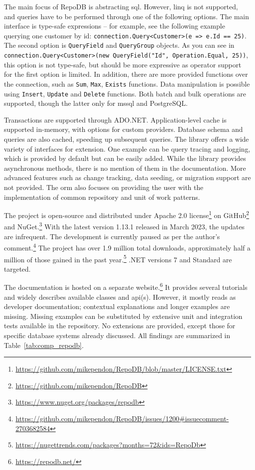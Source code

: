 The main focus of RepoDB is abstracting \acrshort{sql}. However, \acrshort{linq} is not supported, and queries have to be performed through one of the following options. The main interface is type-safe expressions -- for example, see the following example querying one customer by id: \lstinline{connection.Query<Customer>(e => e.Id == 25)}. The second option is \texttt{QueryField} and \texttt{QueryGroup} objects. As you can see in \lstinline{connection.Query<Customer>(new QueryField("Id", Operation.Equal, 25))}, this option is not type-safe, but should be more expressive as operator support for the first option is limited. In addition, there are more provided functions over the connection, such as \texttt{Sum}, \texttt{Max}, \texttt{Exists} functions. Data manipulation is possible using \texttt{Insert}, \texttt{Update} and \texttt{Delete} functions. Both batch and bulk operations are supported, though the latter only for \acrshort{mssql} and PostgreSQL.

Transactions are supported through ADO.NET. Application-level cache is supported in-memory, with options for custom providers. Database schema and queries are also cached, speeding up subsequent queries. The library offers a wide variety of interfaces for extension. One example can be query tracing and logging, which is provided by default but can be easily added. While the library provides asynchronous methods, there is no mention of them in the documentation. More advanced features such as change tracking, data seeding, or migration support are not provided. The \acrshort{orm} also focuses on providing the user with the implementation of common repository and unit of work patterns.

The project is open-source and distributed under Apache 2.0 license\footnote{\url{https://github.com/mikependon/RepoDB/blob/master/LICENSE.txt}} on GitHub\footnote{\url{https://github.com/mikependon/RepoDB}} and NuGet.\footnote{\url{https://www.nuget.org/packages/repodb}} With the latest version 1.13.1 released in March 2023, the updates are infrequent. The development is currently paused as per the author's comment.\footnote{\url{https://github.com/mikependon/RepoDB/issues/1200\#issuecomment-2703682584}} The project has over 1.9 million total downloads, approximately half a million of those gained in the past year.\footnote{\url{https://nugettrends.com/packages?months=72&ids=RepoDb}} .NET versions 7 and Standard are targeted. 

The documentation is hosted on a separate website.\footnote{\url{https://repodb.net/}} It provides several tutorials and widely describes available classes and \acrshort{api}(s). However, it mostly reads as developer documentation; contextual explanations and longer examples are missing. Missing examples can be substituted by extensive unit and integration tests available in the repository. No extensions are provided, except those for specific database systems already discussed. All findings are summarized in Table~\ref{tab:comp_repodb}.



